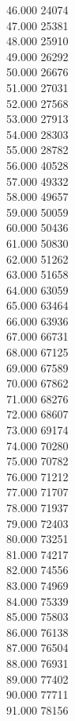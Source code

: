 { 46.000	24074 \\
 47.000	25381 \\
 48.000	25910 \\
 49.000	26292 \\
 50.000	26676 \\
 51.000	27031 \\
 52.000	27568 \\
 53.000	27913 \\
 54.000	28303 \\
 55.000	28782 \\
 56.000	40528 \\
 57.000	49332 \\
 58.000	49657 \\
 59.000	50059 \\
 60.000	50436 \\
 61.000	50830 \\
 62.000	51262 \\
 63.000	51658 \\
 64.000	63059 \\
 65.000	63464 \\
 66.000	63936 \\
 67.000	66731 \\
 68.000	67125 \\
 69.000	67589 \\
 70.000	67862 \\
 71.000	68276 \\
 72.000	68607 \\
 73.000	69174 \\
 74.000	70280 \\
 75.000	70782 \\
 76.000	71212 \\
 77.000	71707 \\
 78.000	71937 \\
 79.000	72403 \\
 80.000	73251 \\
 81.000	74217 \\
 82.000	74556 \\
 83.000	74969 \\
 84.000	75339 \\
 85.000	75803 \\
 86.000	76138 \\
 87.000	76504 \\
 88.000	76931 \\
 89.000	77402 \\
 90.000	77711 \\
 91.000	78156 \\
}
